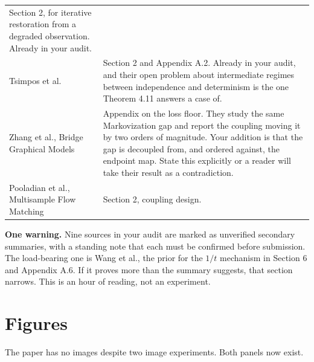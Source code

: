 \documentclass[11pt]{article}
\begin{document}
\begin{longtable}{@{}p{}p{}@{}}
Section 2, for iterative restoration from a degraded observation. Already in your audit.\\
\addlinespace
Tsimpos et al. &
Section 2 and Appendix A.2. Already in your audit, and their open problem about intermediate
regimes between independence and determinism is the one Theorem 4.11 answers a case of.\\
\addlinespace
Zhang et al., Bridge Graphical Models &
Appendix on the loss floor. They study the same Markovization gap and report the coupling moving
it by two orders of magnitude. Your addition is that the gap is decoupled from, and ordered
against, the endpoint map. State this explicitly or a reader will take their result as a
contradiction.\\
\addlinespace
Pooladian et al., Multisample Flow Matching &
Section 2, coupling design.\\
\bottomrule
\end{longtable}

\textbf{One warning.} Nine sources in your audit are marked as unverified secondary summaries,
with a standing note that each must be confirmed before submission. The load-bearing one is Wang
et al., the prior for the $1/t$ mechanism in Section 6 and Appendix A.6. If it proves more than
the summary suggests, that section narrows. This is an hour of reading, not an experiment.

\section{Figures}

The paper has no images despite two image experiments. Both panels now exist.
\end{document}
